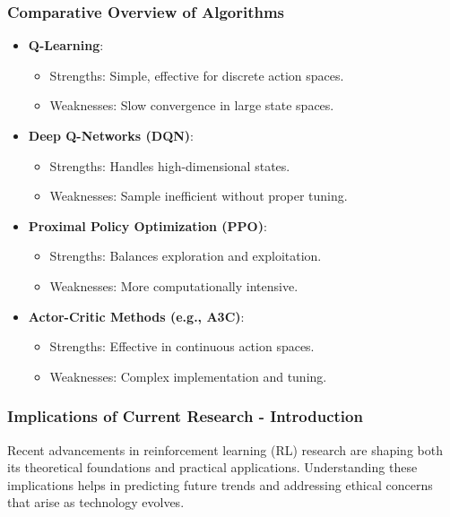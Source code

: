 \documentclass[aspectratio=169]{beamer}
\begin{document}
\begin{frame}[fragile]
    \frametitle{Comparative Overview of Algorithms}
    \begin{itemize}
        \item \textbf{Q-Learning}:
        \begin{itemize}
            \item Strengths: Simple, effective for discrete action spaces.
            \item Weaknesses: Slow convergence in large state spaces.
        \end{itemize}
        
        \item \textbf{Deep Q-Networks (DQN)}:
        \begin{itemize}
            \item Strengths: Handles high-dimensional states.
            \item Weaknesses: Sample inefficient without proper tuning.
        \end{itemize}
        
        \item \textbf{Proximal Policy Optimization (PPO)}:
        \begin{itemize}
            \item Strengths: Balances exploration and exploitation.
            \item Weaknesses: More computationally intensive.
        \end{itemize}
        
        \item \textbf{Actor-Critic Methods (e.g., A3C)}:
        \begin{itemize}
            \item Strengths: Effective in continuous action spaces.
            \item Weaknesses: Complex implementation and tuning.
        \end{itemize}
    \end{itemize}
\end{frame}

\begin{frame}[fragile]
  \frametitle{Implications of Current Research - Introduction}
  Recent advancements in reinforcement learning (RL) research are shaping both its theoretical foundations and practical applications. Understanding these implications helps in predicting future trends and addressing ethical concerns that arise as technology evolves.
\end{frame}
\end{document}
